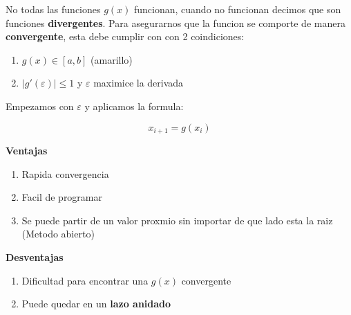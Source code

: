 \documentclass[10pt]{article}
\begin{document}
No todas las funciones $g(x)$ funcionan, cuando no funcionan decimos
que son funciones \textbf{divergentes}. Para asegurarnos que la funcion
se comporte de manera \textbf{convergente}, esta debe cumplir con con 2 coindiciones:

\begin{enumerate}
	\item $g(x) \in [a, b]$ (amarillo)
	\item $|g'(\varepsilon)| \leq 1$ y $\varepsilon$ maximice la derivada
\end{enumerate}

Empezamos con $\varepsilon$ y aplicamos la formula:

\begin{equation}
	x_{i+1} = g(x_i)
\end{equation}

\textbf{Ventajas}

\begin{enumerate}
	\item Rapida convergencia
	\item Facil de programar
	\item Se puede partir de un valor proxmio sin importar de que lado esta la raiz (Metodo abierto)
\end{enumerate}

\textbf{Desventajas}

\begin{enumerate}
	\item Dificultad para encontrar una $g(x)$ convergente
	\item Puede quedar en un \textbf{lazo anidado}
\end{enumerate}
\end{document}
